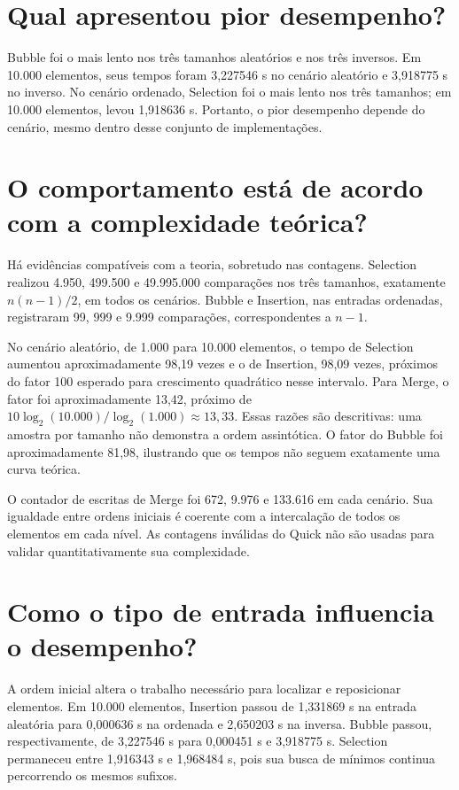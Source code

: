 \documentclass[12pt]{uftex}
\begin{document}
\section{Qual apresentou pior desempenho?}
Bubble foi o mais lento nos três tamanhos aleatórios e nos três inversos. Em 10.000 elementos, seus tempos foram 3,227546 s no cenário aleatório e 3,918775 s no inverso. No cenário ordenado, Selection foi o mais lento nos três tamanhos; em 10.000 elementos, levou 1,918636 s. Portanto, o pior desempenho depende do cenário, mesmo dentro desse conjunto de implementações.

\section{O comportamento está de acordo com a complexidade teórica?}
Há evidências compatíveis com a teoria, sobretudo nas contagens. Selection realizou 4.950, 499.500 e 49.995.000 comparações nos três tamanhos, exatamente $n(n-1)/2$, em todos os cenários. Bubble e Insertion, nas entradas ordenadas, registraram 99, 999 e 9.999 comparações, correspondentes a $n-1$.

No cenário aleatório, de 1.000 para 10.000 elementos, o tempo de Selection aumentou aproximadamente 98,19 vezes e o de Insertion, 98,09 vezes, próximos do fator 100 esperado para crescimento quadrático nesse intervalo. Para Merge, o fator foi aproximadamente 13,42, próximo de $10\log_2(10.000)/\log_2(1.000)\approx13,33$. Essas razões são descritivas: uma amostra por tamanho não demonstra a ordem assintótica. O fator do Bubble foi aproximadamente 81,98, ilustrando que os tempos não seguem exatamente uma curva teórica.

O contador de escritas de Merge foi 672, 9.976 e 133.616 em cada cenário. Sua igualdade entre ordens iniciais é coerente com a intercalação de todos os elementos em cada nível. As contagens inválidas do Quick não são usadas para validar quantitativamente sua complexidade.

\section{Como o tipo de entrada influencia o desempenho?}
A ordem inicial altera o trabalho necessário para localizar e reposicionar elementos. Em 10.000 elementos, Insertion passou de 1,331869 s na entrada aleatória para 0,000636 s na ordenada e 2,650203 s na inversa. Bubble passou, respectivamente, de 3,227546 s para 0,000451 s e 3,918775 s. Selection permaneceu entre 1,916343 s e 1,968484 s, pois sua busca de mínimos continua percorrendo os mesmos sufixos.
\end{document}

